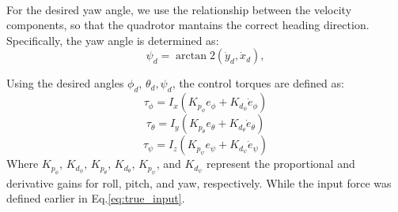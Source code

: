 \noindent\\
For the desired yaw angle, we use the relationship between the velocity 
components, so that the quadrotor mantains the correct heading direction.
Specifically, the yaw angle is determined as:
\begin{equation}
    \psi_d = \arctan2(\dot{y}_d, \dot{x}_d),
\end{equation}

\noindent
Using the desired angles $\phi_d$, $\theta_d, \psi_d$, the control torques are defined as:
\begin{equation}
    \tau_\phi = I_x \left(  K_{p_\phi} e_\phi + K_{d_\phi} \dot{e}_\phi \right)
\end{equation}
\begin{equation}
    \tau_\theta = I_y \left(K_{p_\theta} e_\theta + K_{d_\theta} \dot{e}_\theta \right)
\end{equation}
\begin{equation}
    \tau_\psi = I_z \left(K_{p_\psi} e_\psi + K_{d_\psi} \dot{e}_\psi \right)
\end{equation}
Where $K_{p_\phi}$, $K_{d_\phi}$, $K_{p_\theta}$, $K_{d_\theta}$, $K_{p_\psi}$, and $K_{d_\psi}$ 
represent the proportional and derivative gains for roll, pitch, and yaw, respectively. 
While the input force was defined earlier in Eq.\ref{eq:true_input}.

